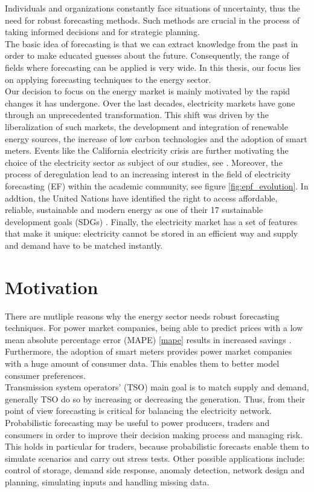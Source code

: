 Individuals and organizations constantly face situations of uncertainty, thus the need for robust forecasting methods. Such methods are crucial in the process of taking informed decisions and for strategic planning.
\\
The basic idea of forecasting is that we can extract knowledge from the past in order to make educated guesses about the future. Consequently, the range of fields where forecasting can be applied is very wide.
In this thesis, our focus lies on applying forecasting techniques to the energy sector. 
\\
Our decision to focus on the energy market is mainly motivated by the rapid changes it has undergone. %
Over the last decades, electricity markets have gone through an unprecedented transformation. This shift was driven by the liberalization of such markets, the development and integration of renewable energy sources, the  increase of low carbon technologies and the adoption of smart meters. Events like the California electricity crisis are further motivating the choice of the electricity sector as subject of our studies, see \cite{california}.
Moreover, the process of deregulation lead to an increasing interest in the field of electricity forecasting (EF) within the academic community, see figure \ref{fig:epf_evolution}.
In addtion, the United Nations have identified the right to access affordable, reliable, sustainable and modern energy as one of their 17 sustainable development goals (SDGs) \cite{un_sdgs}.
Finally, the electricity market has a set of features that make it unique: electricity cannot be stored in an efficient way and supply and demand have to be matched instantly.
\\
\section{Motivation}
There are mutliple reasons why the energy sector needs robust forecasting techniques.
For power market companies, being able to predict prices with a low mean absolute percentage error (MAPE) \ref{mape} results in increased savings \cite{savings}. Furthermore, the adoption of smart meters provides power market companies with a huge amount of consumer data. This enables them to better model consumer preferences.
\\
Transmission system operators' (TSO) main goal is to match supply and demand, generally TSO do so by increasing or decreasing the generation. Thus, from their point of view forecasting is critical for balancing the electricity network.
Probabilistic forecasting may be useful to power producers, traders and consumers in order to improve their decision making process and managing risk. This holds in particular for traders, because probabilistic forecasts enable them to simulate scenarios and carry out stress tests.
Other possible applications include: control of storage, demand side response, anomaly detection, network design and planning, simulating inputs and handling missing data.
\\
